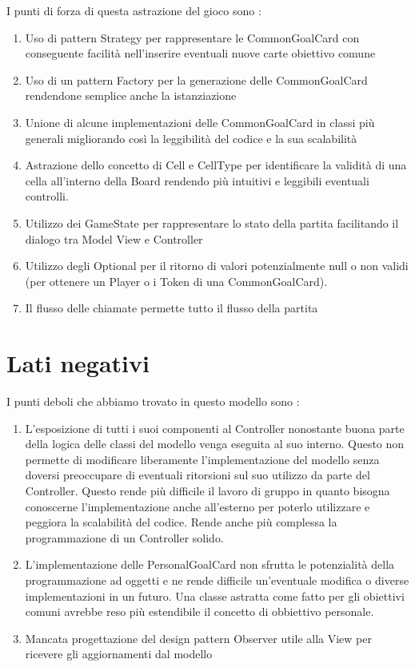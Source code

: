 \documentclass[12pt]{article}
\begin{document}
I punti di forza di questa astrazione del gioco sono :
\begin{enumerate}
    \item Uso di pattern Strategy per rappresentare le CommonGoalCard con conseguente facilità nell'inserire eventuali nuove carte obiettivo comune
    \item Uso di un pattern Factory per la generazione delle CommonGoalCard rendendone semplice anche la istanziazione
    \item Unione di alcune implementazioni delle CommonGoalCard in classi più generali migliorando così la leggibilità del codice e la sua scalabilità
    \item Astrazione dello concetto di Cell e CellType per identificare la validità di una cella all'interno della Board rendendo più intuitivi e leggibili eventuali controlli.
    \item Utilizzo dei GameState per rappresentare lo stato della partita facilitando il dialogo tra Model View e Controller
    \item Utilizzo degli Optional per il ritorno di valori potenzialmente null o non validi (per ottenere un Player o i Token di una CommonGoalCard).
    \item Il flusso delle chiamate permette tutto il flusso della partita
\end{enumerate}

\section{Lati negativi}

I punti deboli che abbiamo trovato in questo modello sono : 
\begin{enumerate}
    \item L'esposizione di tutti i suoi componenti al Controller nonostante buona parte della logica delle classi del modello venga eseguita al suo interno. Questo non permette di modificare liberamente l'implementazione del modello senza doversi preoccupare di eventuali ritorsioni sul suo utilizzo da parte del Controller. Questo rende più difficile il lavoro di gruppo in quanto bisogna conoscerne l'implementazione anche all'esterno per poterlo utilizzare e peggiora la scalabilità del codice. Rende anche più complessa la programmazione di un Controller solido.  
    \item L'implementazione delle PersonalGoalCard non sfrutta le potenzialità della programmazione ad oggetti e ne rende difficile un'eventuale modifica o diverse implementazioni in un futuro. Una classe astratta come fatto per gli obiettivi comuni avrebbe reso più estendibile il concetto di obbiettivo personale. 
    \item Mancata progettazione del design pattern Observer utile alla View per ricevere gli aggiornamenti dal modello
\end{enumerate}
\end{document}
